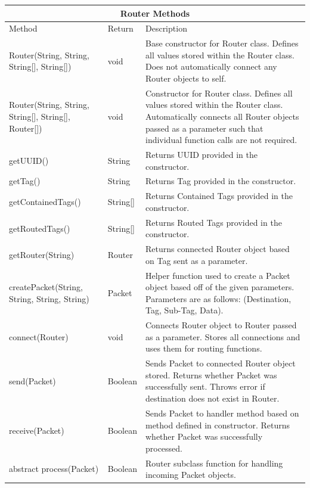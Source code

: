 \documentclass{article}
\begin{document}
\begin{center}
\begin{tabular}{ | p{5cm} || p{3cm} | p{7cm} | }
\hline
\multicolumn{3}{|c|}{Router Methods}\\
\hline
Method & Return & Description\\
\hline
Router(String, String, String[], String[]) & void & Base constructor for Router class. Defines all values stored within the Router class. Does not automatically connect any Router objects to self.\\
\hline
Router(String, String, String[], String[], Router[]) & void & Constructor for Router class. Defines all values stored within the Router class. Automatically connects all Router objects passed as a parameter such that individual function calls are not required.\\
\hline
getUUID() & String & Returns UUID provided in the constructor.\\
\hline
getTag() & String & Returns Tag provided in the constructor.\\
\hline
getContainedTags() & String[] & Returns Contained Tags provided in the constructor.\\
\hline
getRoutedTags() & String[] & Returns Routed Tags provided in the constructor.\\
\hline
getRouter(String) & Router & Returns connected Router object based on Tag sent as a parameter.\\
\hline
createPacket(String, String, String, String) & Packet & Helper function used to create a Packet object based off of the given parameters. Parameters are as follows: (Destination, Tag, Sub-Tag, Data).\\
\hline
connect(Router) & void & Connects Router object to Router passed as a parameter. Stores all connections and uses them for routing functions.\\
\hline
send(Packet) & Boolean & Sends Packet to connected Router object stored. Returns whether Packet was successfully sent. Throws error if destination does not exist in Router.\\
\hline
receive(Packet) & Boolean & Sends Packet to handler method based on method defined in constructor. Returns whether Packet was successfully processed.\\
\hline
abstract process(Packet) & Boolean & Router subclass function for handling incoming Packet objects.\\
\hline
\end{tabular}
\end{center}
\end{document}
